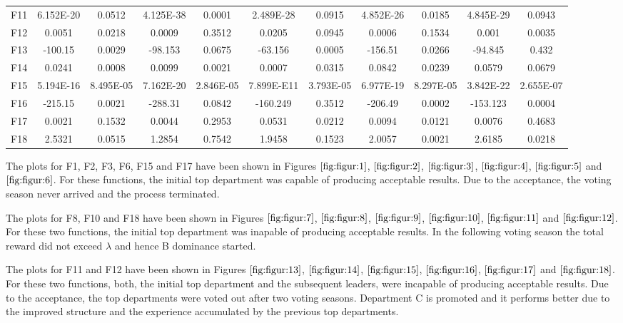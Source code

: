 \documentclass[conference]{IEEEtran}
\begin{document}
\begin{table}
{\begin{tabular}{| c | c  c | c  c | c  c | c  c | c  c |}
{F11}&{6.152E-20}&{0.0512}&{4.125E-38}&{0.0001}&{2.489E-28}&{0.0915}&{4.852E-26}&{0.0185}&{4.845E-29}&{0.0943}\\
{F12}&{0.0051}&{0.0218}&{0.0009}&{0.3512}&{0.0205}&{0.0945}&{0.0006}&{0.1534}&{0.001}&{0.0035}\\
{F13}&{-100.15}&{0.0029}&{-98.153}&{0.0675}&{-63.156}&{0.0005}&{-156.51}&{0.0266}&{-94.845}&{0.432}\\
{F14}&{0.0241}&{0.0008}&{0.0099}&{0.0021}&{0.0007}&{0.0315}&{0.0842}&{0.0239}&{0.0579}&{0.0679}\\
{F15}&{5.194E-16}&{8.495E-05}&{7.162E-20}&{2.846E-05}&{7.899E-E11}&{3.793E-05}&{6.977E-19}&{8.297E-05}&{3.842E-22}&{2.655E-07}\\
{F16}&{-215.15}&{0.0021}&{-288.31}&{0.0842}&{-160.249}&{0.3512}&{-206.49}&{0.0002}&{-153.123}&{0.0004}\\
{F17}&{0.0021}&{0.1532}&{0.0044}&{0.2953}&{0.0531}&{0.0212}&{0.0094}&{0.0121}&{0.0076}&{0.4683}\\
{F18}&{2.5321}&{0.0515}&{1.2854}&{0.7542}&{1.9458}&{0.1523}&{2.0057}&{0.0021}&{2.6185}&{0.0218}\\
\hline
\end{tabular}
}
\end{table}

The plots for F1, F2, F3, F6, F15 and F17 have been shown in Figures $\ref{fig:figur:1}$, $\ref{fig:figur:2}$, $\ref{fig:figur:3}$, $\ref{fig:figur:4}$, $\ref{fig:figur:5}$ and $\ref{fig:figur:6}$. For these functions, the initial top department was capable of producing acceptable results. Due to the acceptance, the voting season never arrived and the process terminated. 


The plots for F8, F10 and F18 have been shown in Figures $\ref{fig:figur:7}$, $\ref{fig:figur:8}$, $\ref{fig:figur:9}$, $\ref{fig:figur:10}$, $\ref{fig:figur:11}$ and $\ref{fig:figur:12}$. For these two functions, the initial top department was inapable of producing acceptable results. In the following voting season the total reward did not exceed $\lambda$ and hence B dominance started. 

The plots for F11 and F12 have been shown in Figures $\ref{fig:figur:13}$, $\ref{fig:figur:14}$, $\ref{fig:figur:15}$, $\ref{fig:figur:16}$, $\ref{fig:figur:17}$ and $\ref{fig:figur:18}$. For these two functions, both, the initial top department and the subsequent leaders, were incapable of producing acceptable results. Due to the acceptance, the top departments were voted out after two voting seasons. Department C is promoted and it performs better due to the improved structure and the experience accumulated by the previous top departments.\\
% 
\end{document}
